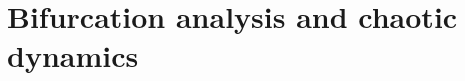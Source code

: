\documentclass{article}
\theoremstyle{plain}
\theoremstyle{definition}
\begin{document}






\section{Bifurcation analysis and chaotic dynamics}\label{section2}
\end{document}
